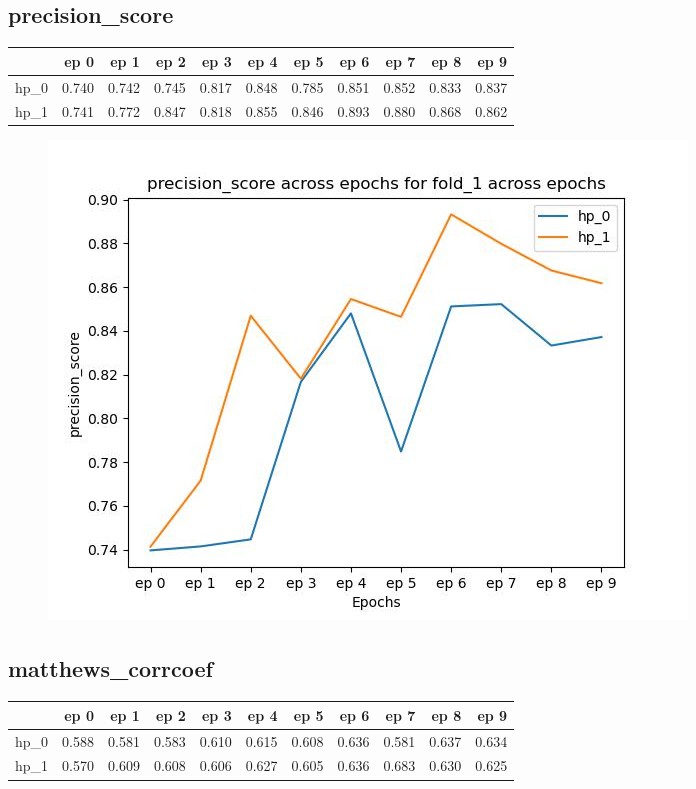 \documentclass{article}
\begin{document}
\subsection{precision\_score}
\begin{tabular}{lrrrrrrrrrr}
\toprule
{} &   ep 0 &   ep 1 &   ep 2 &   ep 3 &   ep 4 &   ep 5 &   ep 6 &   ep 7 &   ep 8 &   ep 9 \\
\midrule
hp\_0 &  0.740 &  0.742 &  0.745 &  0.817 &  0.848 &  0.785 &  0.851 &  0.852 &  0.833 &  0.837 \\
hp\_1 &  0.741 &  0.772 &  0.847 &  0.818 &  0.855 &  0.846 &  0.893 &  0.880 &  0.868 &  0.862 \\
\bottomrule
\end{tabular}

\begin{figure}[H]
\includegraphics[scale = 0.75]{fold_1/precision_score}
\end{figure}
\subsection{matthews\_corrcoef}
\begin{tabular}{lrrrrrrrrrr}
\toprule
{} &   ep 0 &   ep 1 &   ep 2 &   ep 3 &   ep 4 &   ep 5 &   ep 6 &   ep 7 &   ep 8 &   ep 9 \\
\midrule
hp\_0 &  0.588 &  0.581 &  0.583 &  0.610 &  0.615 &  0.608 &  0.636 &  0.581 &  0.637 &  0.634 \\
hp\_1 &  0.570 &  0.609 &  0.608 &  0.606 &  0.627 &  0.605 &  0.636 &  0.683 &  0.630 &  0.625 \\
\bottomrule
\end{tabular}
\end{document}
